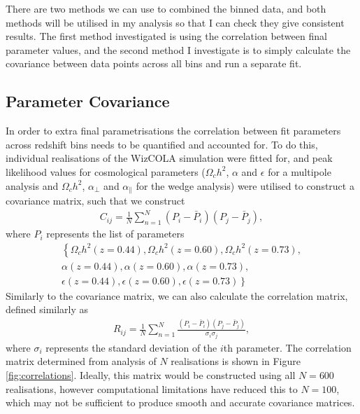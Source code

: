 \documentclass[titlesmallcaps, examinerscopy, copyrightpage]{uqthesis}
\begin{document}
There are two methods we can use to combined the binned data, and both methods will be utilised in my analysis so that I can check they give consistent results. The first method investigated is using the correlation between final parameter values, and the second method I investigate is to simply calculate the covariance between data points across all bins and run a separate fit.

\subsection{Parameter Covariance} \label{sec:parameterCov}

In order to extra final parametrisations the correlation between fit parameters across redshift bins needs to be quantified and accounted for. To do this, individual realisations of the WizCOLA simulation were fitted for, and peak likelihood values for cosmological parameters ($\Omega_c h^2$, $\alpha$ and $\epsilon$ for a multipole analysis and $\Omega_c h^2$, $\alpha_\perp$ and $\alpha_\parallel$ for the wedge analysis) were utilised to construct a covariance matrix, such that we construct
\begin{align}
C_{ij} = \frac{1}{N} \sum\limits_{n=1}^{N} (P_i - \bar{P}_i)(P_j - \bar{P}_j),
\end{align}
where $P_i$ represents the list of parameters 
\begin{align*}
\left\lbrace \Omega_c h^2 (z = 0.44), \Omega_c h^2 (z = 0.60),  \Omega_c h^2 (z = 0.73), \right. \\ 
\alpha (z = 0.44), \alpha (z = 0.60),  \alpha (z = 0.73), \\
\epsilon (z = 0.44), \left. \epsilon (z = 0.60),  \epsilon (z = 0.73) \right\rbrace
\end{align*}
Similarly to the covariance matrix, we can also calculate the correlation matrix, defined similarly as
\begin{align}
R_{ij} = \frac{1}{N} \sum\limits_{n=1}^{N} \frac{(P_i - \bar{P}_i)(P_j - \bar{P}_j)}{\sigma_i \sigma_j},
\end{align}
where $\sigma_i$ represents the standard deviation of the $i$th parameter. The correlation matrix determined from analysis of $N$ realisations is shown in Figure \ref{fig:correlations}. Ideally, this matrix would be constructed using all $N=600$ realisations, however computational limitations have reduced this to $N=100$, which may not be sufficient to produce smooth and accurate covariance matrices.
\end{document}
